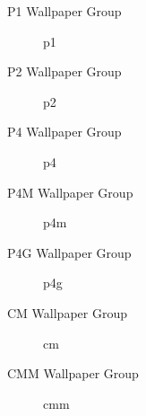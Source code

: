\begin{frame}{P1 Wallpaper Group}
    \begin{figure}
        \centering
        
        \caption{p1}
        \label{fig:p1}
    \end{figure}
\end{frame}

\begin{frame}{P2 Wallpaper Group}
    \begin{figure}
        \centering
        
        \caption{p2}
        \label{fig:p2}
    \end{figure}
\end{frame}

\begin{frame}{P4 Wallpaper Group}
    \begin{figure}
        \centering
        
        \caption{p4}
        \label{fig:p4}
    \end{figure}
\end{frame}

\begin{frame}{P4M Wallpaper Group}
    \begin{figure}
        \centering
        
        \caption{p4m}
        \label{fig:p4m}
    \end{figure}
\end{frame}

\begin{frame}{P4G Wallpaper Group}
    \begin{figure}
        \centering
        
        \caption{p4g}
        \label{fig:p4g}
    \end{figure}
\end{frame}

\begin{frame}{CM Wallpaper Group}
    \begin{figure}
        \centering
        
        \caption{cm}
        \label{fig:cm}
    \end{figure}
\end{frame}

\begin{frame}{CMM Wallpaper Group}
    \begin{figure}
        \centering
        
        \caption{cmm}
        \label{fig:cmm}
    \end{figure}
\end{frame}

